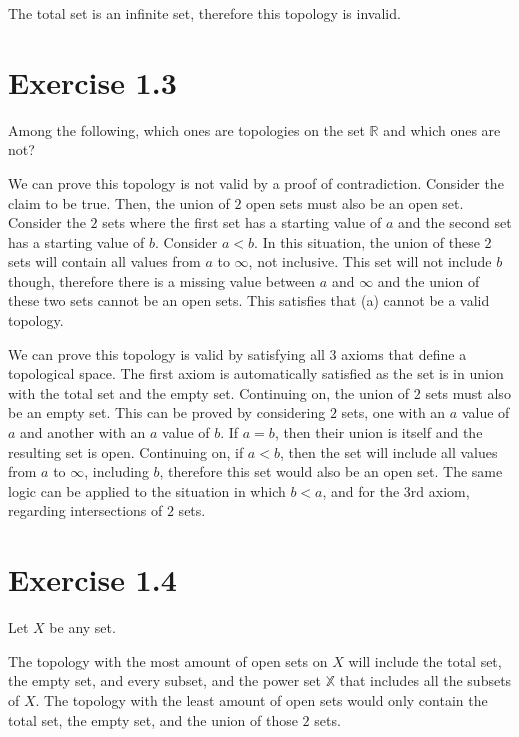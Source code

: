 \documentclass{report}
\begin{document}
\sol The total set is an infinite set, therefore this topology is invalid. 

\section{Exercise 1.3}
\begin{center}
    Among the following, which ones are topologies on the set $\mathbb{R}$ and which ones are not?
\end{center}
\sol We can prove this topology is not valid by a proof of contradiction. Consider the claim to be true. Then, the union of $2$ open sets must also be an open set. Consider the $2$ sets where the first set has a starting value of $a$ and the second set has a starting value of $b$. Consider $a < b$. In this situation, the union of these $2$ sets will contain all values from $a$ to $\infty$, not inclusive. This set will not include $b$ though, therefore there is a missing value between $a$ and $\infty$ and the union of these two sets cannot be an open sets. This satisfies that (a) cannot be a valid topology. 

\qs{1.3.b}{\[\tau = \{[a, \infty) \mid a \in \mathbb{R}\} \cup \{\phi, \mathbb{R}\}\].} 
\sol We can prove this topology is valid by satisfying all $3$ axioms that define a topological space. The first axiom is automatically satisfied as the set is in union with the total set and the empty set. Continuing on, the union of $2$ sets must also be an empty set. This can be proved by considering $2$ sets, one with an $a$ value of $a$ and another with an $a$ value of $b$. If $a = b$, then their union is itself and the resulting set is open. Continuing on, if $a < b$, then the set will include all values from $a$ to $\infty$, including $b$, therefore this set would also be an open set. The same logic can be applied to the situation in which $b < a$, and for the $3$rd axiom, regarding intersections of $2$ sets. 

\section{Exercise 1.4}
\begin{center}
Let $X$ be any set. 
\end{center}
\sol The topology with the most amount of open sets on $X$ will include the total set, the empty set, and every subset, and the power set $\mathbb{X}$ that includes all the subsets of $X$. 
\sol The topology with the least amount of open sets would only contain the total set, the empty set, and the union of those $2$ sets.  
\newpage
\end{document}
